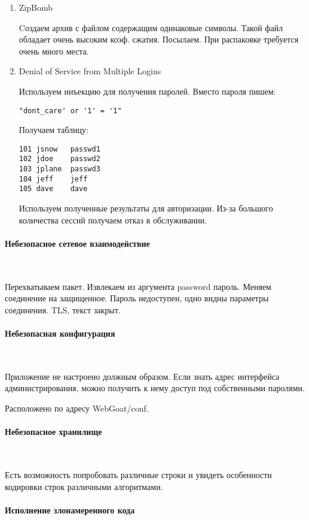 \documentclass{article}
\begin{document}
\begin{enumerate}
\item ZipBomb 

Cоздаем архив с файлом содержащим одинаковые символы. Такой файл обладает очень высоким коэф. сжатия. Посылаем. При распаковке требуется очень много места.

\item Denial of Service from Multiple Logins

Используем инъекцию для получения паролей. Вместо пароля пишем:
\begin{verbatim}
"dont_care' or '1' = '1"
\end{verbatim}

Получаем таблицу:
\begin{verbatim}
101	jsnow	passwd1	
102	jdoe	passwd2	
103	jplane	passwd3	
104	jeff	jeff	
105	dave	dave	
\end{verbatim}

Используем полученные результаты для авторизации. Из-за большого количества сессий получаем отказ в обслуживании.

\end{enumerate}

\paragraph{Небезопасное сетевое взаимодействие}
~

Перехватываем пакет. Извлекаем из аргумента password пароль. Меняем соединение на защищенное. Пароль недоступен, одно видны параметры соединения. TLS, текст закрыт.

\paragraph{Небезопасная конфигурация}
~

Приложение не настроено должным образом. Если знать адрес интерфейса администрирования, можно получить к нему доступ под собственными паролями.

Расположено по адресу WebGoat/conf.

\paragraph{Небезопасное хранилище}
~

Есть возможность попробовать различные строки и увидеть особенности кодировки строк различными алгоритмами.

\paragraph{Исполнение злонамеренного кода}
~
\end{document}

